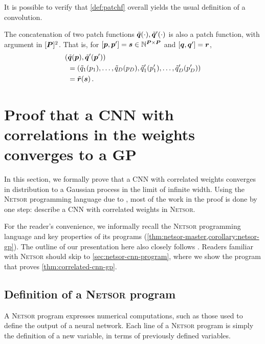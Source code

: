 \documentclass[accepted]{uai2021} %
\newcommand{\Netsor}{\textsc{Netsor}\xspace}
\newcommand{\patchsizebase}{\vP}
\newcommand{\patchf}[2]{{\tilde#1\bra{#2}}}
\newcommand{\patch}{\vp}               %
\newcommand{\patchs}{p}               %
\newcommand{\nextpatch}{\vq}
\newcommand{\nextpatchs}{q}
\newcommand{\0}{\boldsymbol{0}}
\newcommand{\1}{\boldsymbol{1}}
\newcommand{\crefp}[1]{(\cref{#1})}
\begin{document}
It is possible to verify that \cref{def:patchf} overall yields the usual definition of a convolution.

\begin{remark}
  The concatenation of two patch functions $\patchf{\nextpatch}{\cdot},\patchf{\nextpatch'}{\cdot}$ is also a patch function, with argument in $\countto{\patchsizebase}^{2}$. That is, for $[\patch,\patch'] = \vs \in \sN^{\patchsizebase \times \patchsizebase}$ and $[\nextpatch,\nextpatch'] = \vr$,
  \begin{align}
    (&\patchf{\nextpatch}{\patch},\patchf{\nextpatch'}{\patch'}) \nonumber\\&=
    \bra{\patchf{\nextpatchs_{1}}{\patchs_{1}}, \dots, \patchf{\nextpatchs_{D}}{\patchs_{D}},
    \patchf{\nextpatchs'_{1}}{\patchs'_{1}}, \dots, \patchf{\nextpatchs'_{D}}{\patchs'_{D}}
    }\nonumber\\&= \patchf{\vr}{\vs}\,.
  \end{align}
  \label{rem:concat-patchf}
  \end{remark}

\section{Proof that a CNN with correlations in the weights converges to a GP}\label{app:netsor}

In this section, we formally prove that a CNN with correlated weights converges in distribution
to a Gaussian process in the limit of infinite width. Using the \Netsor
programming language due to \citet{yang2019wide}, most of the work in the proof
is done by
one step: describe a CNN with correlated weights in \Netsor.

For the reader's convenience, we informally recall the \Netsor programming language
\citep{yang2019wide} and key properties of its programs \crefp{thm:netsor-master,corollary:netsor-gp}.
The outline of our presentation here also closely follows
\citet{yang2019wide}. Readers familiar with \Netsor should skip to
\cref{sec:netsor-cnn-program}, where we show the program that proves \cref{thm:correlated-cnn-gp}.


\subsection{Definition of a \Netsor program}\label{sec:netsor-programming}
A \Netsor program expresses numerical computations, such as those used to define the output of a neural network. Each line of a \Netsor program is simply the definition of a new variable, in terms of previously defined variables.
\end{document}
